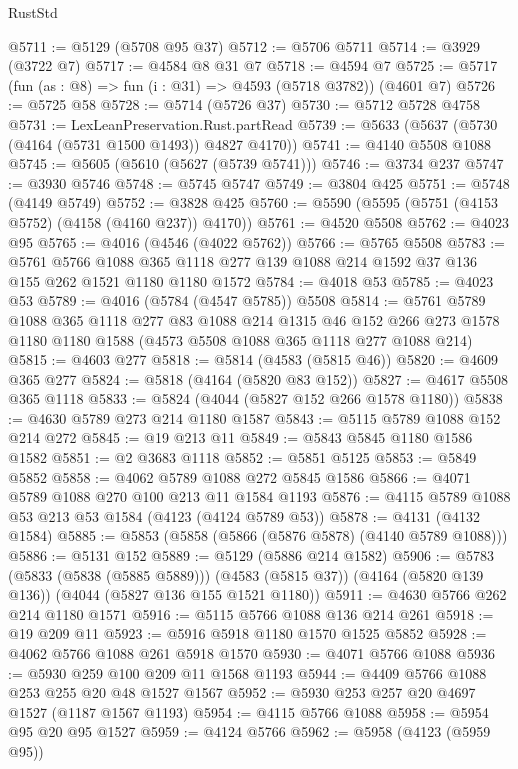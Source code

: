 \begin{lexlean}{RustStd}
\begin{coremodule}
@5711 := @5129 (@5708 @95 @37)
@5712 := @5706 @5711
@5714 := @3929 (@3722 @7)
@5717 := @4584 @8 @31 @7
@5718 := @4594 @7
@5725 := @5717 (fun (as : @8) => fun (i : @31) => @4593 (@5718 @3782)) (@4601 @7)
@5726 := @5725 @58
@5728 := @5714 (@5726 @37)
@5730 := @5712 @5728 @4758
@5731 := LexLeanPreservation.Rust.partRead
@5739 := @5633 (@5637 (@5730 (@4164 (@5731 @1500 @1493)) @4827 @4170))
@5741 := @4140 @5508 @1088
@5745 := @5605 (@5610 (@5627 (@5739 @5741)))
@5746 := @3734 @237
@5747 := @3930 @5746
@5748 := @5745 @5747
@5749 := @3804 @425
@5751 := @5748 (@4149 @5749)
@5752 := @3828 @425
@5760 := @5590 (@5595 (@5751 (@4153 @5752) (@4158 (@4160 @237)) @4170))
@5761 := @4520 @5508
@5762 := @4023 @95
@5765 := @4016 (@4546 (@4022 @5762))
@5766 := @5765 @5508
@5783 := @5761
    @5766
    @1088
    @365
    @1118
    @277
    @139
    @1088
    @214
    @1592
    @37
    @136
    @155
    @262
    @1521
    @1180
    @1180
    @1572
@5784 := @4018 @53
@5785 := @4023 @53
@5789 := @4016 (@5784 (@4547 @5785)) @5508
@5814 := @5761
    @5789
    @1088
    @365
    @1118
    @277
    @83
    @1088
    @214
    @1315
    @46
    @152
    @266
    @273
    @1578
    @1180
    @1180
    @1588
    (@4573 @5508 @1088 @365 @1118 @277 @1088 @214)
@5815 := @4603 @277
@5818 := @5814 (@4583 (@5815 @46))
@5820 := @4609 @365 @277
@5824 := @5818 (@4164 (@5820 @83 @152))
@5827 := @4617 @5508 @365 @1118
@5833 := @5824 (@4044 (@5827 @152 @266 @1578 @1180))
@5838 := @4630 @5789 @273 @214 @1180 @1587
@5843 := @5115 @5789 @1088 @152 @214 @272
@5845 := @19 @213 @11
@5849 := @5843 @5845 @1180 @1586 @1582
@5851 := @2 @3683 @1118
@5852 := @5851 @5125
@5853 := @5849 @5852
@5858 := @4062 @5789 @1088 @272 @5845 @1586
@5866 := @4071 @5789 @1088 @270 @100 @213 @11 @1584 @1193
@5876 := @4115 @5789 @1088 @53 @213 @53 @1584 (@4123 (@4124 @5789 @53))
@5878 := @4131 (@4132 @1584)
@5885 := @5853 (@5858 (@5866 (@5876 @5878) (@4140 @5789 @1088)))
@5886 := @5131 @152
@5889 := @5129 (@5886 @214 @1582)
@5906 := @5783
    (@5833 (@5838 (@5885 @5889)))
    (@4583 (@5815 @37))
    (@4164 (@5820 @139 @136))
    (@4044 (@5827 @136 @155 @1521 @1180))
@5911 := @4630 @5766 @262 @214 @1180 @1571
@5916 := @5115 @5766 @1088 @136 @214 @261
@5918 := @19 @209 @11
@5923 := @5916 @5918 @1180 @1570 @1525 @5852
@5928 := @4062 @5766 @1088 @261 @5918 @1570
@5930 := @4071 @5766 @1088
@5936 := @5930 @259 @100 @209 @11 @1568 @1193
@5944 := @4409 @5766 @1088 @253 @255 @20 @48 @1527 @1567
@5952 := @5930 @253 @257 @20 @4697 @1527 (@1187 @1567 @1193)
@5954 := @4115 @5766 @1088
@5958 := @5954 @95 @20 @95 @1527
@5959 := @4124 @5766
@5962 := @5958 (@4123 (@5959 @95))

\end{coremodule}
\end{lexlean}
